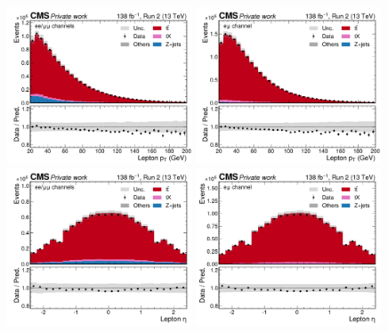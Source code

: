 \begin{figure}[!hp]
    \centering
    \includegraphics[width=0.49\textwidth]{figures/ah/controlplots/ReqMET/lep_pt__sf.pdf}
    \hfill
    \includegraphics[width=0.49\textwidth]{figures/ah/controlplots/ReqMET/lep_pt__em.pdf}
    \includegraphics[width=0.49\textwidth]{figures/ah/controlplots/ReqMET/lep_eta__sf.pdf}
    \hfill
    \includegraphics[width=0.49\textwidth]{figures/ah/controlplots/ReqMET/lep_eta__em.pdf}

\end{figure}

